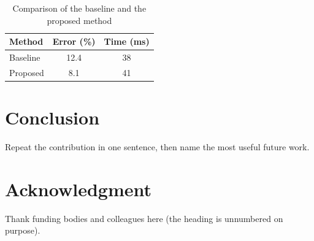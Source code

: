 \documentclass[conference]{IEEEtran}
\begin{document}
\begin{table}[t]
  \caption{Comparison of the baseline and the proposed method}
  \label{tab:results}
  \centering
  \begin{tabular}{lcc}
    \toprule
    Method & Error (\%) & Time (ms) \\
    \midrule
    Baseline & 12.4 & 38 \\
    Proposed & 8.1 & 41 \\
    \bottomrule
  \end{tabular}
\end{table}


\section{Conclusion}
Repeat the contribution in one sentence, then name the most useful future work.

\section*{Acknowledgment}
Thank funding bodies and colleagues here (the heading is unnumbered on purpose).



\end{document}
